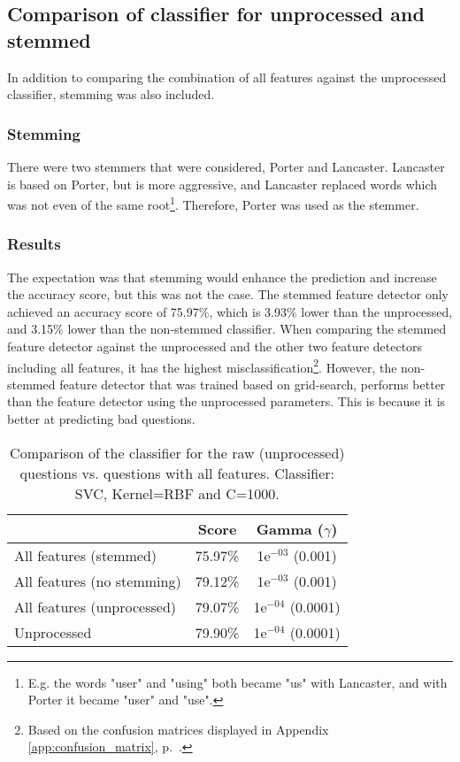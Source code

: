 \subsection{Comparison of classifier for unprocessed and stemmed}
\label{sec:comparing_unprocessed_all_features}
In addition to comparing the combination of all features against the unprocessed classifier, stemming was also included. 

\subsubsection{Stemming}
\label{stemming}
There were two stemmers that were considered, Porter and Lancaster.
Lancaster is based on Porter, but is more aggressive, and Lancaster replaced words which was not even of the same root\footnote{
	E.g. the words "user" and "using" both became "us" with Lancaster, and with Porter it became "user" and "use".
}.
Therefore, Porter was used as the stemmer.

\subsubsection{Results}
The expectation was that stemming would enhance the prediction and increase the accuracy score, but this was not the case. 
The stemmed feature detector only achieved an accuracy score of 75.97\%, which is 3.93\% lower than the unprocessed, and 3.15\% lower than the non-stemmed classifier.
When comparing the stemmed feature detector against the unprocessed and the other two feature detectors including all features, it has the highest misclassification\footnote{ 
	Based on the confusion matrices displayed in Appendix \ref{app:confusion_matrix}, p.~\pageref{app:confusion_matrix}.
}.
However, the non-stemmed feature detector that was trained based on grid-search, performs better than the feature detector using the unprocessed parameters.
This is because it is better at predicting bad questions.


\begin{table}[!h]%
	\centering
	\begin{tabular}{| l | c | c |}
		\hline
		~ 							& Score		& Gamma ($\gamma$)		\\ \hline
		All features (stemmed)		& 75.97\%	& 1e$^{-03}$ (0.001)	\\ \hline
		All features (no stemming)	& 79.12\%	& 1e$^{-03}$ (0.001)	\\ \hline
		All features (unprocessed)	& 79.07\%	& 1e$^{-04}$ (0.0001)	\\ \hline
		Unprocessed					& 79.90\%	& 1e$^{-04}$ (0.0001)	\\ \hline
	\end{tabular}
	\caption{Comparison of the classifier for the raw (unprocessed) questions vs. questions with all features. Classifier: SVC, Kernel=RBF and C=1000.}
	\label{tab:unprocessed_vs_all_feature_detectors_svc_so}
\end{table}


